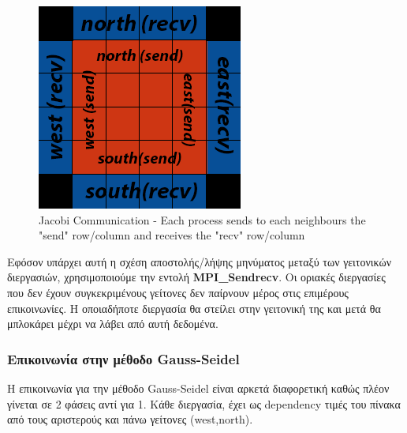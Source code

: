 \documentclass[../final_report.tex]{subfiles}
\begin{document}
\begin{figure}[H]
    \centering
    \includegraphics[scale=3]{jacobi-comm.png}
    \caption{Jacobi Communication - Each process sends to each neighbours the "send" row/column and receives the "recv" row/column}
    \label{fig:Jacobi Communication}
\end{figure}

Εφόσον υπάρχει αυτή η σχέση αποστολής/λήψης μηνύματος μεταξύ των γειτονικών διεργασιών, χρησιμοποιούμε την εντολή \textbf{MPI\_Sendrecv}. Οι οριακές
διεργασίες που δεν έχουν συγκεκριμένους γείτονες δεν παίρνουν μέρος στις επιμέρους επικοινωνίες. Η οποιαδήποτε διεργασία θα στείλει στην γειτονική της
και μετά θα μπλοκάρει μέχρι να λάβει από αυτή δεδομένα.

\subsubsection*{Επικοινωνία στην μέθοδο Gauss-Seidel}

Η επικοινωνία για την μέθοδο Gauss-Seidel είναι αρκετά διαφορετική καθώς πλέον γίνεται σε 2 φάσεις αντί για 1. Κάθε διεργασία, έχει ως dependency τιμές του 
πίνακα από τους αριστερούς και πάνω γείτονες (west,north).
\end{document}
